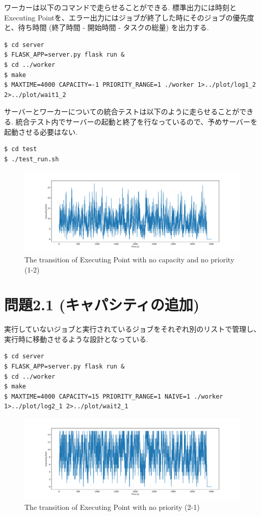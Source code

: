 ワーカーは以下のコマンドで走らせることができる.
標準出力には時刻とExecuting Pointを、エラー出力にはジョブが終了した時にそのジョブの優先度と、待ち時間 (終了時間 - 開始時間 - タスクの総量) を出力する.

\begin{lstlisting}[]
$ cd server
$ FLASK_APP=server.py flask run &
$ cd ../worker
$ make
$ MAXTIME=4000 CAPACITY=-1 PRIORITY_RANGE=1 ./worker 1>../plot/log1_2 2>../plot/wait1_2
\end{lstlisting}

サーバーとワーカーについての統合テストは以下のように走らせることができる.
統合テスト内でサーバーの起動と終了を行なっているので、予めサーバーを起動させる必要はない.

\begin{lstlisting}[]
$ cd test
$ ./test_run.sh
\end{lstlisting}

\begin{figure}[htbp]
  \centering
  \includegraphics[width=\linewidth]{imgs/log1_2.pdf}
  \caption{The transition of Executing Point with no capacity and no priority (1-2)}
  \label{fig:log1_2}
\end{figure}

\clearpage
\section*{問題2.1 (キャパシティの追加)}

実行していないジョブと実行されているジョブをそれぞれ別のリストで管理し、実行時に移動させるような設計となっている.

\begin{lstlisting}[]
$ cd server
$ FLASK_APP=server.py flask run &
$ cd ../worker
$ make
$ MAXTIME=4000 CAPACITY=15 PRIORITY_RANGE=1 NAIVE=1 ./worker 1>../plot/log2_1 2>../plot/wait2_1
\end{lstlisting}

\begin{figure}[htbp]
  \centering
  \includegraphics[width=\linewidth]{imgs/log2_1.pdf}
  \caption{The transition of Executing Point with no priority (2-1)}
  \label{fig:log2_1}
\end{figure}

